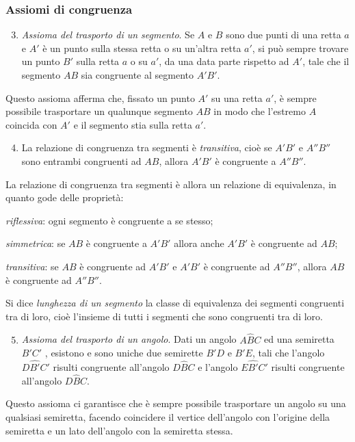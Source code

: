 \subsubsection{Assiomi di congruenza}

\begin{enumerate}[label=\Roman{*}.]
\setcounter{enumi}{2}
\item \emph{Assioma del trasporto di un segmento}. Se $A$ e $B$ sono due punti di una retta $a$ e $A'$ è un punto sulla stessa retta o su un'altra retta $a'$, si può sempre trovare un punto $B'$ sulla retta $a$ o su $a'$, da una data parte rispetto ad $A'$, tale che il segmento $AB$ sia congruente al segmento $A'B'$.
\end{enumerate}
Questo assioma afferma che, fissato un punto $A'$ su una retta $a'$, è sempre possibile trasportare un qualunque segmento $AB$ in modo che l'estremo $A$ coincida con $A'$ e il segmento stia sulla retta $a'$.

\begin{enumerate}[label=\Roman{*}.]
\setcounter{enumi}{3}
\item La relazione di congruenza tra segmenti è \emph{transitiva}, cioè se $A'B'$ e $A''B''$ sono entrambi congruenti ad $AB$, allora $A'B'$ è congruente a $A''B''$.
\end{enumerate}
La relazione di congruenza tra segmenti è allora un relazione di equivalenza, in quanto gode delle proprietà:
\begin{enumeratea}
\item \emph{riflessiva}: ogni segmento è congruente a se stesso;
\item \emph{simmetrica}: se $AB$ è congruente a $A'B'$ allora anche $A'B'$ è congruente ad $AB$;
\item \emph{transitiva}: se $AB$ è congruente ad $A'B'$ e $A'B'$ è congruente ad $A''B''$, allora $AB$ è congruente ad $A''B''$.
\end{enumeratea}

\begin{definizione}
Si dice \emph{lunghezza di un segmento} la classe di equivalenza dei segmenti congruenti tra di loro, cioè l'insieme di tutti i segmenti che sono congruenti tra di loro.
\end{definizione}

\begin{enumerate}[label=\Roman{*}.]
\setcounter{enumi}{4}
\item \emph{Assioma del trasporto di un angolo}. Dati un angolo $A\widehat{B}C$ ed una semiretta $B'C'$ , esistono e sono uniche due semirette $B'D$ e $B'E$, tali che l'angolo $D\widehat{B'}C'$ risulti congruente all'angolo $D\widehat{B}C$ e l'angolo $E\widehat{B'}C'$ risulti congruente all'angolo $D\widehat{B}C$.
\end{enumerate}
Questo assioma ci garantisce che è sempre possibile trasportare un angolo su una qualsiasi semiretta, facendo coincidere il vertice dell'angolo con l'origine della semiretta e un lato dell'angolo con la semiretta stessa.

